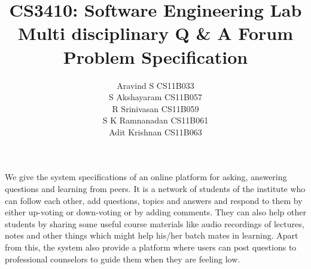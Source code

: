 \documentclass{article}
\begin{document}
\title{\textbf{CS3410: Software Engineering Lab}
\\
\textbf{Multi disciplinary Q \& A Forum\\Problem Specification}}
\author{ Aravind S CS11B033 \\
		 S Akshayaram CS11B057\\
		 R Srinivasan CS11B059\\
		 S K Ramnanadan CS11B061\\
		 Adit Krishnan  CS11B063\\
[0.2in]
}

\maketitle

We give the system specifications of an online platform for asking, answering questions and learning from peers. It is a network of students of the institute who can follow each other, add questions, topics and answers and respond to them by either up-voting or down-voting or by adding comments. They can also help other students by sharing some useful course materials like audio recordings of lectures, notes and other things which might help his/her batch mates in learning. Apart from this, the system also provide a platform where users can post questions to professional counselors to guide them when they are feeling low.  
\end{document}
